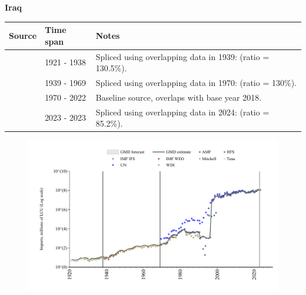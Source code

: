 \documentclass[12pt,a4paper,landscape]{article}
\begin{document}
\begin{adjustbox}{max totalsize={\paperwidth}{\paperheight},center}
\begin{minipage}[t][\textheight][t]{\textwidth}
\vspace*{0.5cm}
{}
\begin{center}
{\Large\bfseries Iraq}
\end{center}
\vspace{0.5cm}
\begin{table}[H]
\centering
\small
\begin{tabular}{|l|l|l|}
\hline
\textbf{Source} & \textbf{Time span} & \textbf{Notes} \\
\hline
\rowcolor{white}\cite{Tena}& 1921 - 1938 &Spliced using overlapping data in 1939: (ratio = 130.5\%).\\
\rowcolor{lightgray}\cite{Mitchell}& 1939 - 1969 &Spliced using overlapping data in 1970: (ratio = 130\%).\\
\rowcolor{white}\cite{WDI}& 1970 - 2022 &Baseline source, overlaps with base year 2018.\\
\rowcolor{lightgray}\cite{IMF_IFS}& 2023 - 2023 &Spliced using overlapping data in 2024: (ratio = 85.2\%).\\
\hline
\end{tabular}
\end{table}
\begin{figure}[H]
\centering
\includegraphics[width=\textwidth,height=0.6\textheight,keepaspectratio]{graphs/IRQ_imports.pdf}
\end{figure}
\end{minipage}
\end{adjustbox}
\end{document}
